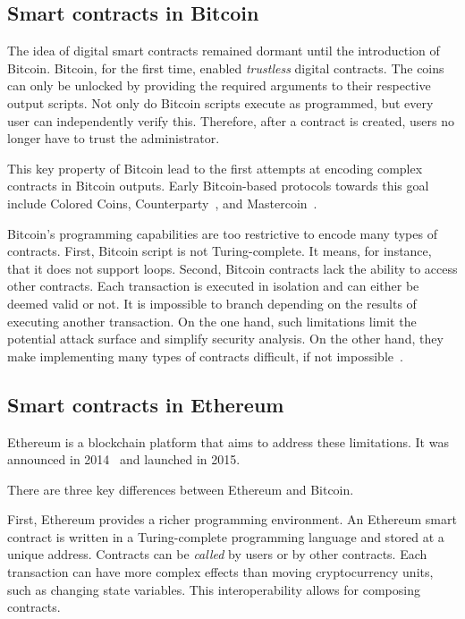 \subsection{Smart contracts in Bitcoin}

The idea of digital smart contracts remained dormant until the introduction of Bitcoin.
Bitcoin, for the first time, enabled \textit{trustless} digital contracts.
The coins can only be unlocked by providing the required arguments to their respective output scripts.
Not only do Bitcoin scripts execute as programmed, but every user can independently verify this.
Therefore, after a contract is created, users no longer have to trust the administrator.

This key property of Bitcoin lead to the first attempts at encoding complex contracts in Bitcoin outputs.
Early Bitcoin-based protocols towards this goal include Colored Coins\cite{Rosenfeld2012}, Counterparty~\cite{Counterparty, Bartoletti2017a}, and Mastercoin~\cite{Willett2016}.

Bitcoin's programming capabilities are too restrictive to encode many types of contracts.
First, Bitcoin script is not Turing-complete.
It means, for instance, that it does not support loops.
Second, Bitcoin contracts lack the ability to access other contracts.
Each transaction is executed in isolation and can either be deemed valid or not.
It is impossible to branch depending on the results of executing another transaction.
On the one hand, such limitations limit the potential attack surface and simplify security analysis.
On the other hand, they make implementing many types of contracts difficult, if not impossible~\cite{Miller2019}.


\subsection{Smart contracts in Ethereum}

Ethereum is a blockchain platform that aims to address these limitations.
It was announced in 2014~\cite{Buterin2014, Wood2014} and launched in 2015.

There are three key differences between Ethereum and Bitcoin.

First, Ethereum provides a richer programming environment.
An Ethereum smart contract is written in a Turing-complete programming language and stored at a unique address.
Contracts can be \textit{called} by users or by other contracts.
Each transaction can have more complex effects than moving cryptocurrency units, such as changing state variables.
This interoperability allows for composing contracts.

